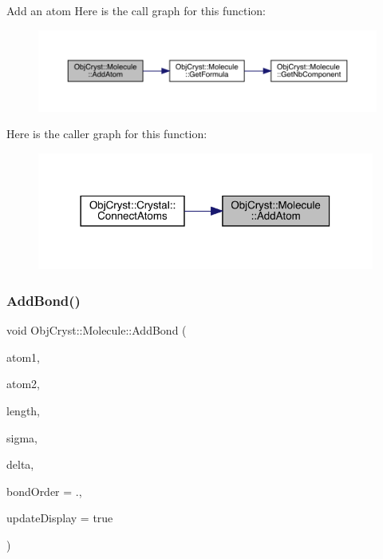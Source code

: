 Add an atom Here is the call graph for this function\+:
\nopagebreak
\begin{figure}[H]
\begin{center}
\leavevmode
\includegraphics[width=350pt]{class_obj_cryst_1_1_molecule_a7b193eac062233b758887cba671706f7_cgraph}
\end{center}
\end{figure}
Here is the caller graph for this function\+:
\nopagebreak
\begin{figure}[H]
\begin{center}
\leavevmode
\includegraphics[width=314pt]{class_obj_cryst_1_1_molecule_a7b193eac062233b758887cba671706f7_icgraph}
\end{center}
\end{figure}
\mbox{\label{class_obj_cryst_1_1_molecule_aa37feb3abde7ca0ff6453b97d910800f}} 
\subsubsection{\texorpdfstring{AddBond()}{AddBond()}}
{\footnotesize\ttfamily void Obj\+Cryst\+::\+Molecule\+::\+Add\+Bond (\begin{DoxyParamCaption}\item[{\mbox{\hyperlink{class_obj_cryst_1_1_mol_atom}{Mol\+Atom}} \&}]{atom1,  }\item[{\mbox{\hyperlink{class_obj_cryst_1_1_mol_atom}{Mol\+Atom}} \&}]{atom2,  }\item[{const R\+E\+AL}]{length,  }\item[{const R\+E\+AL}]{sigma,  }\item[{const R\+E\+AL}]{delta,  }\item[{const R\+E\+AL}]{bond\+Order = {.},  }\item[{const bool}]{update\+Display = {\ttfamily true} }\end{DoxyParamCaption})}

